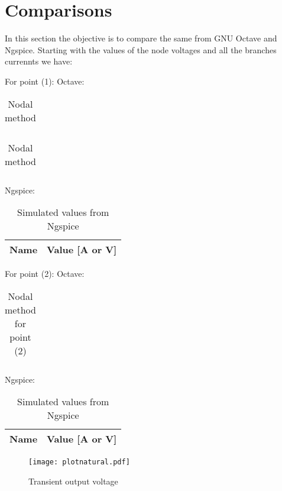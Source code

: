 \section{Comparisons}
\label{sec:comparisons}

In this section the objective is to compare the same from GNU Octave and Ngspice. 
Starting with the values of the node voltages and all the branches currennts we have: 

\vspace{0.5cm}
For point (1):
Octave: 
\FloatBarrier
\begin{table}[h]
  \centering
  \begin{tabular}{|c|c|c|c|c|c|c|}
    \hline    
    
    \hline
  \end{tabular}
  \caption{Nodal method}
  \label{tab:nodal}
\end{table}
\FloatBarrier  

\FloatBarrier
\begin{table}[h]
  \centering
  \begin{tabular}{|c|c|c|c|c|c|c|}
    \hline    
    
    \hline
  \end{tabular}
  \caption{Nodal method}
  \label{tab:nodal}
\end{table}
\FloatBarrier 

Ngspice: 
\FloatBarrier
\begin{table}[h]
  \centering
  \begin{tabular}{|l|r|}
    \hline    
    {\bf Name} & {\bf Value [A or V]} \\ \hline
    
  \end{tabular}
  \caption{Simulated values from Ngspice}
  \label{tab:op}
\end{table}
\FloatBarrier



\vspace{0.5cm} 
For point (2): 
Octave:
\vspace{0.2cm}
\FloatBarrier
\begin{table}[h]
  \centering
  \begin{tabular}{|c|c|c|c|c|c|c|}
    \hline    
    
    \hline
  \end{tabular}
  \caption{Nodal method for point (2)}
  \label{tab:nodal}
\end{table}
\FloatBarrier   

Ngspice:
\FloatBarrier
\begin{table}[h]
  \centering
  \begin{tabular}{|l|r|}
    \hline    
    {\bf Name} & {\bf Value [A or V]} \\ \hline
    
  \end{tabular}
  \caption{Simulated values from Ngspice}
  \label{tab:op}
\end{table}
\FloatBarrier


\begin{figure}[h] \centering
\texttt{[image: plotnatural.pdf]}
\caption{Transient output voltage}
\label{fig:plotnatural}
\end{figure}








